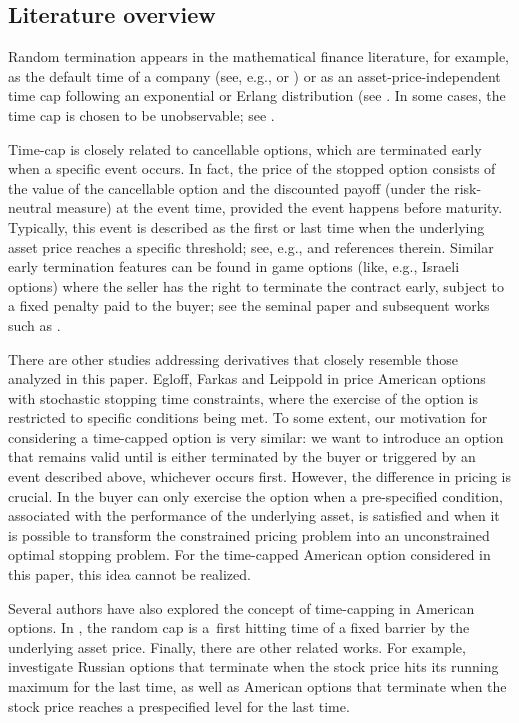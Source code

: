 \documentclass[10pt]{amsart}
\begin{document}
	\subsection{Literature overview}
	Random termination appears in the mathematical finance literature, for example, as the default time of a company (see, e.g., \cite[p. 27]{BieleckiRutkowski} or \cite{Mladen}) or
	as an asset-price-independent time cap following an exponential or Erlang distribution (see \cite{carr, Florin}. In some cases, the time cap is chosen to be unobservable; see \cite{gapeev1}.
	
	Time-cap is closely related to cancellable options, which are terminated early when a specific event occurs. In fact, the price of the stopped option consists of the value of the cancellable option and the discounted payoff (under the risk-neutral measure) at the event time, provided the event happens before maturity.
	Typically, this event is described as the first or last time when the underlying asset price
	reaches a specific threshold; see, e.g., \cite{1st_pass, algo} and references therein.
	Similar early termination features can be found in game options (like, e.g., Israeli options) where the seller has the right to terminate the contract early, subject to a fixed penalty paid to the buyer; see the seminal paper \cite{kifer}
	and subsequent works such as \cite{meyer, Zaevski2, Zaevski2b}.
	
	There are other studies addressing derivatives that closely resemble those analyzed in this paper.
	Egloff, Farkas and Leippold in \cite{time_constraints} price American options with
	stochastic stopping time constraints, where the exercise of the option is restricted to specific conditions being met.
	To some extent, our motivation for considering a time-capped option is very similar:
	we want to introduce an option that remains valid until is either terminated by the buyer or triggered by an event described above, whichever occurs first.
	However, the difference in pricing is crucial. In \cite{time_constraints} the buyer can only exercise the option
when a pre-specified condition, associated with the performance of the underlying asset, is satisfied and when it is possible to transform the constrained pricing problem into an unconstrained optimal stopping problem.
	For the time-capped American option considered in this paper, this idea cannot be realized.
	
	
	Several authors have also explored the concept of time-capping in American options.
	In \cite{trabelsi}, the random cap is a~first hitting time of a fixed barrier by
	the underlying asset price. Finally, there are other related works.
	For example, \cite{russian, random_put, ott} investigate Russian options that terminate when the stock price hits its running maximum for the last time, as well as American options that terminate when the stock price reaches a prespecified level for the last time.
	
\end{document}
